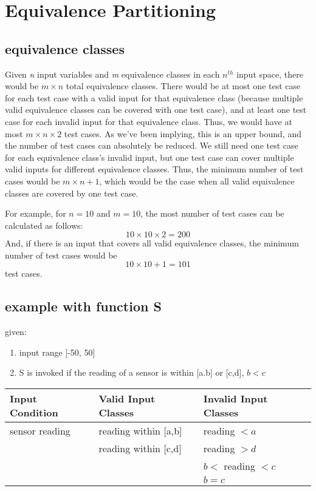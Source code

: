 \documentclass[letterpaper]{article}
\begin{document}
\section{Equivalence Partitioning}
\subsection{equivalence classes}
Given \emph{n} input variables and \emph{m} equivalence classes in each $n^{th}$
input space, there would be $m \times n$ total equivalence classes.
There would be at most one test case for each test case with a valid input for
that equivalence class (because multiple valid equivalence classes can be
covered with one test case), and at least one test case for each invalid input
for that equivalence class. Thus, we would have at most $m \times n \times 2$
test cases. As we've been implying, this is an upper bound, and the number of
test cases can absolutely be reduced. We still need one test case for each
equivalence class's invalid input, but one test case can cover multiple
valid inputs for different equivalence classes. Thus, the minimum number
of test cases would be $m \times n + 1$, which would be the case when
all valid equivalence classes are covered by one test case.

For example, for $n=10$ and $m=10$, the most number of test cases can be calculated as follows:
\[ 10 \times 10 \times 2 = 200 \]
And, if there is an input that covers all valid equivalence classes, the minimum number of test cases would be
\[ 10 \times 10 + 1 = 101 \] test cases.

\subsection{example with function S}
given:
\begin{enumerate}
	\item input range [-50, 50]
	\item S is invoked if the reading of a sensor is within [a.b] or [c,d], $b < c$
\end{enumerate}

\begin{adjustbox}{center}
	\begin{tabularx}{1.2\textwidth}{X|X|X|}
		Input Condition & Valid Input Classes  & Invalid Input Classes \\ \hline
		sensor reading  & reading within [a,b] & reading $<a$          \\
		                & reading within [c,d] & reading $>d$          \\
		                &                      & $b <$ reading $< c$   \\
		                &                      & $b=c$                 \\ \hline
	\end{tabularx}
\end{adjustbox}

\end{document}

